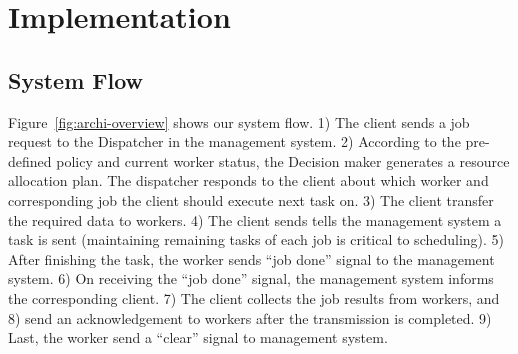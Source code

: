 \section{Implementation}  %

\subsection{System Flow}	%

Figure~\ref{fig:archi-overview} shows our system flow.
1) The client sends a job request to the Dispatcher in the management 
system.
2) According to the pre-defined policy and current worker status, the 
Decision maker generates a resource allocation plan.
The dispatcher responds to the client about which worker and
corresponding job the client should execute next task on.
3) The client transfer the required data to workers.
4) The client sends tells the management system a task is sent
(maintaining remaining tasks of each job is critical to scheduling).
5) After finishing the task, the worker sends ``job done'' signal to the
management system.
6) On receiving the ``job done'' signal,  the management system informs
the corresponding client.
7) The client collects the job results from workers, and
8) send an acknowledgement to workers after the transmission is 
completed.
9) Last, the worker send a ``clear'' signal to management system.

